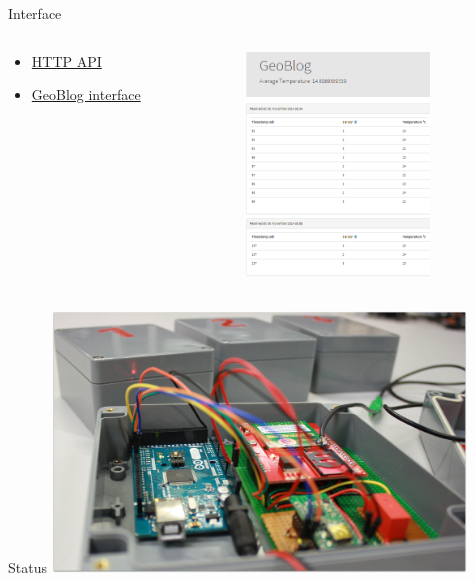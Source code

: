 \documentclass{beamer}
\begin{document}
\begin{frame}{Interface}
\begin{columns}[T] %
     \begin{column}[T]{4cm} %
		
		\begin{itemize}
		\item \href{http://sveinnel.com:5000/geolog}{HTTP API}
		\item \href{http://sveinnel.com:5000/geoblog}{GeoBlog interface}
		\end{itemize}
	\end{column}
     \begin{column}[T]{5cm} %
          \includegraphics[height=6cm]{graphics/GeoBlog.png}
     \end{column}
     \end{columns}
\end{frame}

\begin{frame}{Status}
\centering
\includegraphics[width=11cm]{graphics/Field_pictures/Open_project.jpg}
\end{frame}
\end{document}
